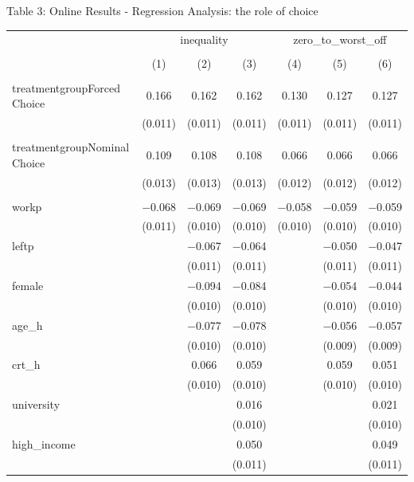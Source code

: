 \documentclass{beamer}
\begin{document}
\begin{frame}{Table 3: Online Results -  Regression Analysis: the role of choice}
	
	\begin{block}\tiny
		
	\begin{table}[!htbp] \centering \tiny
		\begin{tabular}{@{\extracolsep{0pt}}lcccccc} 
	\\[-1.0ex] & \multicolumn{3}{c}{inequality} & \multicolumn{3}{c}{zero\_to\_worst\_off} \\ 
	\\[-1.0ex] & (1) & (2) & (3) & (4) & (5) & (6)\\ 
	\hline \\[-1.0ex] 
	treatmentgroupForced Choice & 0.166 & 0.162 & 0.162 & 0.130 & 0.127 & 0.127 \\ 
	& (0.011) & (0.011) & (0.011) & (0.011) & (0.011) & (0.011) \\ 
	& & & & & & \\ 
	treatmentgroupNominal Choice & 0.109 & 0.108 & 0.108 & 0.066 & 0.066 & 0.066 \\ 
	& (0.013) & (0.013) & (0.013) & (0.012) & (0.012) & (0.012) \\ 
	& & & & & & \\ 
	workp & $-$0.068 & $-$0.069 & $-$0.069 & $-$0.058 & $-$0.059 & $-$0.059 \\ 
	& (0.011) & (0.010) & (0.010) & (0.010) & (0.010) & (0.010) \\ 
	leftp &  & $-$0.067 & $-$0.064 &  & $-$0.050 & $-$0.047 \\ 
	&  & (0.011) & (0.011) &  & (0.011) & (0.011) \\ 
	female &  & $-$0.094 & $-$0.084 &  & $-$0.054 & $-$0.044 \\ 
	&  & (0.010) & (0.010) &  & (0.010) & (0.010) \\ 
	age\_h &  & $-$0.077 & $-$0.078 &  & $-$0.056 & $-$0.057 \\ 
	&  & (0.010) & (0.010) &  & (0.009) & (0.009) \\ 
	crt\_h &  & 0.066 & 0.059 &  & 0.059 & 0.051 \\ 
	&  & (0.010) & (0.010) &  & (0.010) & (0.010) \\ 
	university &  &  & 0.016 &  &  & 0.021 \\ 
	&  &  & (0.010) &  &  & (0.010) \\ 
	high\_income &  &  & 0.050 &  &  & 0.049 \\ 
	&  &  & (0.011) &  &  & (0.011) \\ 

\end{tabular}
\end{table}
\end{block}
\end{frame}
\end{document}
